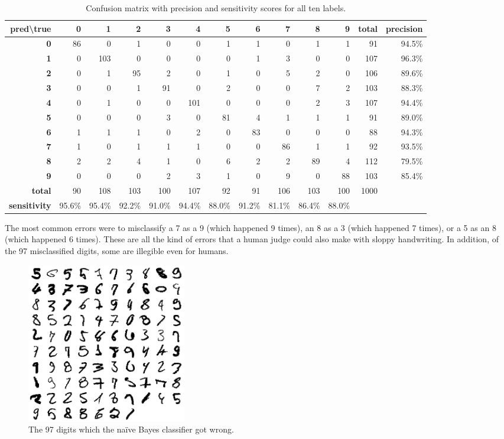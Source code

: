 \documentclass[11pt]{article}
\begin{document}
\begin{table}[h!]
\centering
\setlength\tabcolsep{4pt}
\begin{tabular}{| r | r | r | r | r | r | r | r | r | r | r | r | r |}
\hline
\textbf{pred\textbackslash true} & \textbf{0} & \textbf{1} & \textbf{2} & \textbf{3} & \textbf{4} & \textbf{5} & \textbf{6} & \textbf{7} & \textbf{8} & \textbf{9} & \textbf{total} & \textbf{precision} \\
\hline
\textbf{0} & 86 & 0 & 1 & 0 & 0 & 1 & 1 & 0 & 1 & 1 & 91 & 94.5\% \\
\hline
\textbf{1} & 0 & 103 & 0 & 0 & 0 & 0 & 1 & 3 & 0 & 0 & 107 & 96.3\% \\
\hline
\textbf{2} & 0 & 1 & 95 & 2 & 0 & 1 & 0 & 5 & 2 & 0 & 106 & 89.6\% \\
\hline
\textbf{3} & 0 & 0 & 1 & 91 & 0 & 2 & 0 & 0 & 7 & 2 & 103 & 88.3\% \\
\hline
\textbf{4} & 0 & 1 & 0 & 0 & 101 & 0 & 0 & 0 & 2 & 3 & 107 & 94.4\% \\
\hline
\textbf{5} & 0 & 0 & 0 & 3 & 0 & 81 & 4 & 1 & 1 & 1 & 91 & 89.0\% \\
\hline
\textbf{6} & 1 & 1 & 1 & 0 & 2 & 0 & 83 & 0 & 0 & 0 & 88 & 94.3\% \\
\hline
\textbf{7} & 1 & 0 & 1 & 1 & 1 & 0 & 0 & 86 & 1 & 1 & 92 & 93.5\% \\
\hline
\textbf{8} & 2 & 2 & 4 & 1 & 0 & 6 & 2 & 2 & 89 & 4 & 112 & 79.5\% \\
\hline
\textbf{9} & 0 & 0 & 0 & 2 & 3 & 1 & 0 & 9 & 0 & 88 & 103 & 85.4\% \\
\hline
\textbf{total} & 90 & 108 & 103 & 100 & 107 & 92 & 91 & 106 & 103 & 100 & 1000 & \\
\hline
\textbf{sensitivity} & 95.6\% & 95.4\% & 92.2\% & 91.0\% & 94.4\% & 88.0\% & 91.2\% & 81.1\% & 86.4\% & 88.0\% & & \\
\hline
\end{tabular}
\caption{Confusion matrix with precision and sensitivity scores for all ten labels.}
\label{nbc_confusion_matix}
\end{table}

The most common errors were to misclassify a 7 as a 9 (which happened 9 times), an 8 as
a 3 (which happened 7 times), or a 5 as an 8 (which happened 6 times). These are all the
kind of errors that a human judge could also make with sloppy handwriting. In addition,
of the 97 misclassified digits, some are illegible even for humans.

\begin{figure}[h!]
\centering
\includegraphics[height=2.75in, width=2.75in]{digits.png}
\caption{The 97 digits which the na{\"i}ve Bayes classifier got wrong.}
\label{nbc_digits}
\end{figure}
\end{document}
